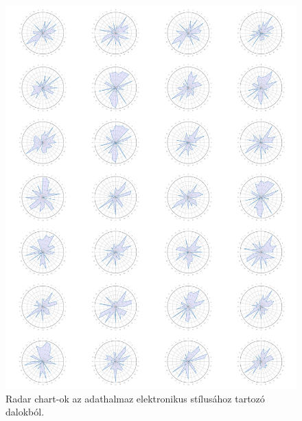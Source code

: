 \begin{figure}[p]
    \includegraphics{src/images/radar_electronic.png}
    \caption{Radar chart-ok az adathalmaz elektronikus stílusához tartozó dalokból.}
\end{figure}

